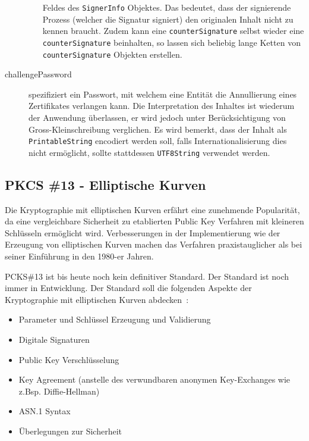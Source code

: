 \documentclass[10pt,a4paper]{article}
\begin{document}
\begin{description}
\begin{itemize}
                Feldes des \texttt{SignerInfo} Objektes. Das bedeutet, dass der
                signierende Prozess (welcher die Signatur signiert) den originalen Inhalt
                nicht zu kennen braucht. Zudem kann eine \texttt{counterSignature} selbst
                wieder eine \texttt{counterSignature} beinhalten, so lassen sich beliebig
                lange Ketten von \texttt{counterSignature} Objekten erstellen.
        \end{itemize}
    \item[challengePassword] spezifiziert ein Passwort, mit welchem eine Entität die
        Annullierung eines Zertifikates verlangen kann. Die Interpretation des Inhaltes
        ist wiederum der Anwendung überlassen, er wird jedoch unter Berücksichtigung von
        Gross-Kleinschreibung verglichen. Es wird bemerkt, dass der Inhalt als
        \texttt{PrintableString} encodiert werden soll, falls Internationalisierung dies
        nicht ermöglicht, sollte stattdessen \texttt{UTF8String} verwendet werden.
\end{description}


\subsection{PKCS \#13 - Elliptische Kurven}

Die Kryptographie mit elliptischen Kurven erfährt eine zunehmende Popularität, da eine
vergleichbare Sicherheit zu etablierten Public Key Verfahren mit kleineren Schlüsseln
ermöglicht wird. Verbesserungen in der Implementierung wie der Erzeugung von elliptischen
Kurven machen das Verfahren praxistauglicher als bei seiner Einführung in den 1980-er
Jahren.

PCKS\#13 ist bis heute noch kein definitiver Standard. Der Standard ist noch immer in
Entwicklung. Der Standard soll die folgenden Aspekte der Kryptographie mit elliptischen
Kurven abdecken~\cite{pkcs13-proj}:

\begin{itemize}
    \item Parameter und Schlüssel Erzeugung und Validierung
    \item Digitale Signaturen
    \item Public Key Verschlüsselung
    \item Key Agreement (anstelle des verwundbaren anonymen Key-Exchanges wie z.Bsp.
        Diffie-Hellman)
    \item ASN.1 Syntax
    \item Überlegungen zur Sicherheit
\end{itemize}
\end{document}
